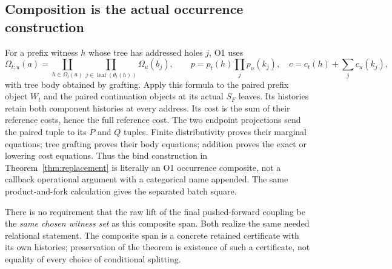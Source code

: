 \documentclass[11pt,a4paper]{article}
\theoremstyle{definition}
\newcommand{\leaf}{\operatorname{leaf}}
\begin{document}
\subsection{Composition is the actual occurrence construction}
For a prefix witness $h$ whose tree has addressed holes $j$, O1 uses
\begin{equation}\label{eq:occurrence}
 \Omega_{t;u}(a)=\coprod_{h\in\Omega_t(a)}
                 \prod_{j\in\leaf(\theta_t(h))}\Omega_u(b_j),
 \qquad
 p=p_t(h)\prod_jp_u(k_j),\quad c=c_t(h)+\sum_jc_u(k_j),
\end{equation}
with tree body obtained by grafting. Apply this formula to the paired
prefix object $W_t$ and the paired continuation objects at its actual
$S_F$ leaves. Its histories retain both component histories at every
address. Its cost is the sum of their reference costs, hence the full
reference cost. The two endpoint projections send the paired tuple to
its $P$ and $Q$ tuples. Finite distributivity proves their marginal
equations; tree grafting proves their body equations; addition proves
the exact or lowering cost equations. Thus the bind construction in
Theorem~\ref{thm:replacement} is literally an O1 occurrence composite,
not a callback operational argument with a categorical name appended.
The same product-and-fork calculation gives the separated batch square.

There is no requirement that the raw lift of the final pushed-forward
coupling be the \emph{same chosen witness set} as this composite span.
Both realize the same needed relational statement. The composite span
is a concrete retained certificate with its own histories; preservation
of the theorem is existence of such a certificate, not equality of every
choice of conditional splitting.
\end{document}
